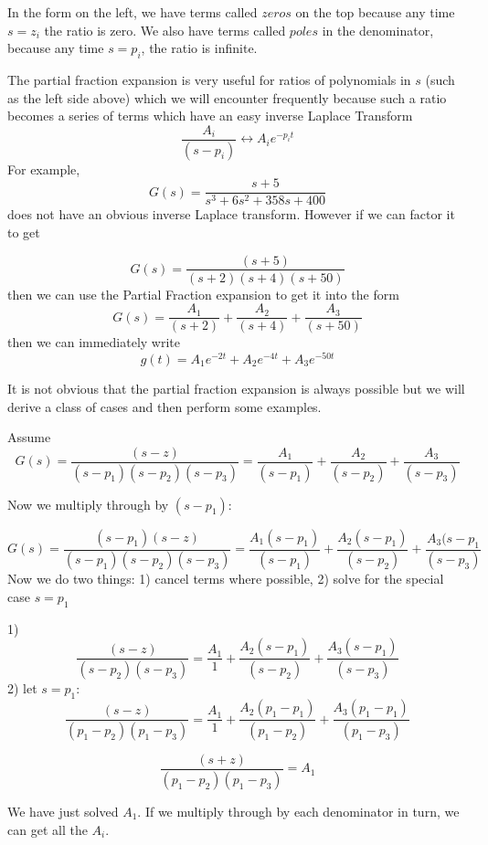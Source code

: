 In the form on the left, we have terms called $zeros$ on the top because any time $s=z_i$ the ratio is zero.  We also have terms called $poles$ in the denominator, because any time $s=p_i$, the ratio is infinite.

The partial fraction expansion is very useful for ratios of polynomials in $s$ (such as the left side above) which we will encounter frequently because such a ratio becomes a series of terms which have an easy inverse Laplace Transform
\[
\frac{A_i}{(s-p_i)}   \leftrightarrow  A_ie^{-p_it}
\]
For example,
\[
G(s) = \frac{s+5}{s^3 + 6s^2+ 358s+400}
\]
does not have an obvious inverse Laplace transform.   However if we can factor it to get

\[
G(s) = \frac  {(s+5)}   {(s+2)(s+4)(s+50)}
\]
then we can use the Partial Fraction expansion to  get it into the form
\[
G(s) = \frac{A_1}{(s+2)}+\frac{A_2}{(s+4)}+\frac{A_3}{(s+50)}
\]
then we can immediately write
\[
g(t) = A_1e^{-2t} + A_2e^{-4t} + A_3e^{-50t}
\]





It is not obvious that the partial fraction expansion is always possible but we will derive a class of cases and then perform some examples.

Assume
\[
G(s) = \frac  {(s-z)}   {(s-p_1)(s-p_2)(s-p_3)} =  \frac{A_1}{(s-p_1)}+\frac{A_2}{(s-p_2)}+\frac{A_3}{(s-p_3)}
\]

Now we multiply through by $(s-p_1)$:

\[
G(s) = \frac  {(s-p_1)(s-z)}   {(s-p_1)(s-p_2)(s-p_3)} =  \frac{A_1(s-p_1)}{(s-p_1)}+\frac{A_2(s-p_1)}{(s-p_2)}+\frac{A_3(s-p_1}{(s-p_3)}
\]
Now we do two things:  1) cancel terms where possible,  2) solve for the special case $s=p_1$


1)
\[
\frac  {(s-z)}   {(s-p_2)(s-p_3)} =  \frac{A_1}{1}+\frac{A_2(s-p_1)}{(s-p_2)}+\frac{A_3(s-p_1)}{(s-p_3)}
\]
2)
let $s=p_1$:
\[
\frac  {(s-z)}   {(p_1-p_2)(p_1-p_3)} =  \frac{A_1}{1}+\frac{A_2(p_1-p_1)}{(p_1-p_2)}+\frac{A_3(p_1-p_1)}{(p_1-p_3)}
\]

\[
\frac  {(s+z)}   {(p_1-p_2)(p_1-p_3)} =  {A_1}
\]

We have just solved $A_1$.    If we multiply through by each denominator in turn, we can get all the $A_i$.




